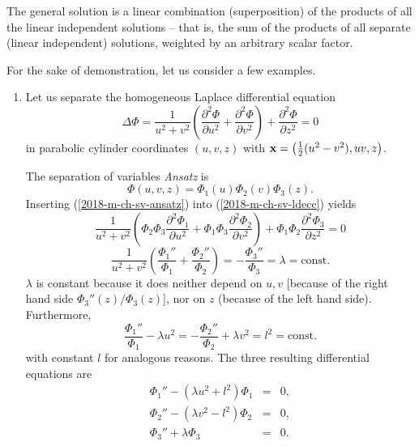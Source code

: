The general solution
is a linear combination (superposition) of the products of all the linear independent solutions --
that is, the sum of the products of all separate (linear independent) solutions, weighted by an arbitrary scalar factor.

{
\color{blue}
\bexample

For the sake of demonstration, let us consider a few examples.

\begin{enumerate}
\item
Let us separate the homogeneous Laplace differential equation
\begin{equation}
\Delta \Phi =\frac{1}{u^2+v^2}
  \left(
    \frac{\partial^2\Phi}{\partial u^2}+
    \frac{\partial^2\Phi}{\partial v^2}
  \right)+
  \frac{\partial^2\Phi}{\partial z^2}
= 0
\label{2018-m-ch-sv-ldecc}
\end{equation}
in parabolic
cylinder coordinates $(u,v,z)$ with
${\bf x} = \left({1 \over 2} (u^2 - v^2), uv, z\right) $.


The separation of variables {\it Ansatz} is
\begin{equation}
\Phi(u,v,z)=\Phi_1(u)\Phi_2(v)\Phi_3(z).
\label{2018-m-ch-sv-ansatz}
\end{equation}
Inserting (\ref{2018-m-ch-sv-ansatz}) into (\ref{2018-m-ch-sv-ldecc}) yields
$$
  \frac{1}{u^2+v^2}
  \left(
    \Phi_2\Phi_3\frac{\partial^2\Phi_1}{\partial u^2}+
    \Phi_1\Phi_3\frac{\partial^2\Phi_2}{\partial v^2}
  \right)+
  \Phi_1\Phi_2\frac{\partial^2\Phi_3}{\partial z^2}=0
$$
$$
 \frac{1}{u^2+v^2}
  \left(
    \frac{\Phi_1''}{\Phi_1}+
    \frac{\Phi_2''}{\Phi_2}
  \right)=
  -\frac{\Phi_3''}{\Phi_3}=\lambda=\mbox{const.}
$$
$\lambda$ is constant because it does neither depend on $u,v$ [because of the right hand side
$ {\Phi_3'' (z)/\Phi_3 (z)}$],
nor on $z$ (because of the left hand side).
Furthermore,
$$
  \frac{\Phi_1''}{\Phi_1}- \lambda u^2 =
-  \frac{\Phi_2''}{\Phi_2}+   \lambda v^2=l^2=\mbox{const.}
$$
with constant $l$ for analogous reasons.
The three resulting differential equations are
\begin{eqnarray*}
  \Phi_1''-(\lambda u^2+l^2) \Phi_1 & = & 0, \\
  \Phi_2''-(\lambda v^2-l^2) \Phi_2 & = & 0, \\
  \Phi_3''+\lambda\Phi_3 & = & 0.
\end{eqnarray*}





\end{enumerate}}

